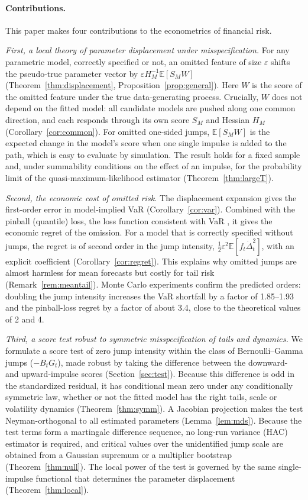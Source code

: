 \documentclass[11pt,a4paper]{article}
\theoremstyle{definition}
\theoremstyle{remark}
\newcommand{\E}{\mathbb{E}}
\begin{document}
\paragraph{Contributions.} This paper makes four contributions to the econometrics of financial risk.

\emph{First, a local theory of parameter displacement under misspecification.} For any parametric model, correctly specified or not, an omitted feature of size $\varepsilon$ shifts the pseudo-true parameter vector by $\varepsilon H_M^{-1}\E[S_MW]$ (Theorem~\ref{thm:displacement}, Proposition~\ref{prop:general}). Here $W$ is the score of the omitted feature under the true data-generating process. Crucially, $W$ does not depend on the fitted model: all candidate models are pushed along one common direction, and each responds through its own score $S_M$ and Hessian $H_M$ (Corollary~\ref{cor:common}). For omitted one-sided jumps, $\E[S_MW]$ is the expected change in the model's score when one single impulse is added to the path, which is easy to evaluate by simulation. The result holds for a fixed sample and, under summability conditions on the effect of an impulse, for the probability limit of the quasi-maximum-likelihood estimator (Theorem~\ref{thm:largeT}).

\emph{Second, the economic cost of omitted risk.} The displacement expansion gives the first-order error in model-implied VaR (Corollary~\ref{cor:var}). Combined with the pinball (quantile) loss, the loss function consistent with VaR \citep{koenker1978,gneiting2011}, it gives the economic regret of the omission. For a model that is correctly specified without jumps, the regret is of second order in the jump intensity, $\tfrac12\varepsilon^2\E[f_t\dot\Delta_t^2]$, with an explicit coefficient (Corollary~\ref{cor:regret}). This explains why omitted jumps are almost harmless for mean forecasts but costly for tail risk (Remark~\ref{rem:meantail}). Monte Carlo experiments confirm the predicted orders: doubling the jump intensity increases the VaR shortfall by a factor of 1.85--1.93 and the pinball-loss regret by a factor of about 3.4, close to the theoretical values of 2 and 4.

\emph{Third, a score test robust to symmetric misspecification of tails and dynamics.} We formulate a score test of zero jump intensity within the class of Bernoulli--Gamma jumps ($-B_tG_t$), made robust by taking the difference between the downward- and upward-impulse scores (Section~\ref{sec:test}). Because this difference is odd in the standardized residual, it has conditional mean zero under any conditionally symmetric law, whether or not the fitted model has the right tails, scale or volatility dynamics (Theorem~\ref{thm:symm}). A Jacobian projection makes the test Neyman-orthogonal to all estimated parameters (Lemma~\ref{lem:mds}). Because the test terms form a martingale difference sequence, no long-run variance (HAC) estimator is required, and critical values over the unidentified jump scale are obtained from a Gaussian supremum or a multiplier bootstrap (Theorem~\ref{thm:null}). The local power of the test is governed by the same single-impulse functional that determines the parameter displacement (Theorem~\ref{thm:local}).
\end{document}
